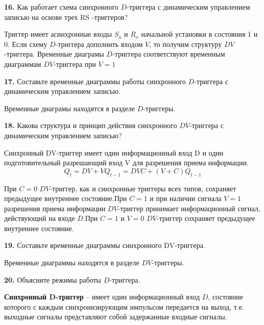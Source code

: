 \documentclass[a4paper,12pt]{article}
\begin{document}
\noindent\textbf{16.} Как работает схема синхронного $D$-триггера с динамическим управлением записью на основе трех RS -триггеров? \newline

\noindent Триггер имеет асинхронные входы $S_{a}$ и $R_{a}$ начальной установки в состояния 1 и 0. Если схему $D$-триггера дополнить входом $V$, то получим структуру $DV$-триггера. Временные диаграмы $D$-триггера соответствуют временным диаграммам $DV$-триггера при $V = 1$\newline

\clearpage
\noindent\textbf{17.} Составьте временные диаграммы работы синхронного $D$-триггера с динамическим управлением записью. \newline

\noindent Временные диаграмы находятся в разделе $D$-триггеры.\newline

\noindent\textbf{18.} Какова структура и принцип действия синхронного $DV$-триггера с динамическим управлением записью? \newline

\noindent Синхронный DV-триггер имеет один информационный вход D и один подготовительный разрешающий вход V для разрешения приема информации. $$Q_{t} = DV + VQ_{t - 1} = DVC + (V + C)Q_{t - 1}$$

\noindent При $C = 0$ $DV$-триггер, как и синхронные триггеры всех типов, сохраняет предыдущее внутреннее состояние.\newline При $C = 1$ и при наличии сигнала $V = 1$ разрешения приема информации $DV$-триггер принимает информационный сигнал, действующий на входе $D$.\newline При $C = 1$ и $V = 0$ $DV$-триггер сохраняет предыдущее внутреннее состояние.\newline

\noindent\textbf{19.} Составьте временные диаграммы синхронного DV-триггера. \newline

\noindent Временные диаграммы находятся в разделе $DV$-триггеры.\newline

\noindent\textbf{20.} Объясните режимы работы $D$-триггера. \newline

\noindent\textbf{Синхронный D-триггер} -- имеет один информационный вход $D$, состояние которого с каждым синхронизирующим импульсом передается на выход, т.е. выходные сигналы представляют собой задержанные входные сигналы.
\end{document}
